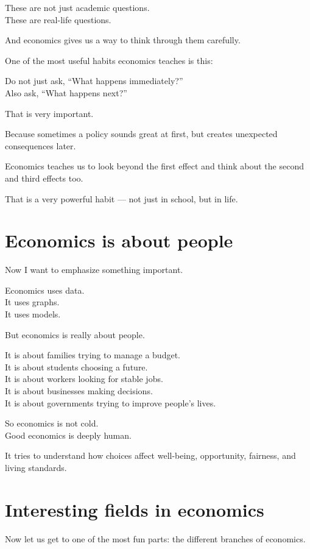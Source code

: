 \documentclass[12pt]{article}
\begin{document}
These are not just academic questions.\\
These are real-life questions.

And economics gives us a way to think through them carefully.

One of the most useful habits economics teaches is this:

Do not just ask, “What happens immediately?”\\
Also ask, “What happens next?”

That is very important.

Because sometimes a policy sounds great at first, but creates unexpected consequences later.

Economics teaches us to look beyond the first effect and think about the second and third effects too.

That is a very powerful habit --- not just in school, but in life.

\section*{Economics is about people}

Now I want to emphasize something important.

Economics uses data.\\
It uses graphs.\\
It uses models.

But economics is really about people.

It is about families trying to manage a budget.\\
It is about students choosing a future.\\
It is about workers looking for stable jobs.\\
It is about businesses making decisions.\\
It is about governments trying to improve people’s lives.

So economics is not cold.\\
Good economics is deeply human.

It tries to understand how choices affect well-being, opportunity, fairness, and living standards.

\section*{Interesting fields in economics}

Now let us get to one of the most fun parts: the different branches of economics.
\end{document}

